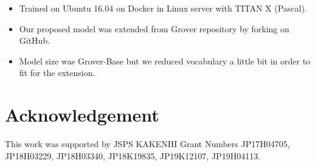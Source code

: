 \documentclass[conference]{IEEEtran}
\begin{document}
\label{app:settings}
\begin{itemize}[]
    \item Trained on Ubuntu 16.04 on Docker in Linux server with TITAN X (Pascal).
    \item Our proposed model was extended from Grover repository by forking on GitHub.
    \item Model size was Grover-Base but we reduced vocabulary a little bit in order to fit for the extension.
\end{itemize}

\section*{Acknowledgement}
This work was supported by JSPS KAKENHI Grant Numbers JP17H04705, JP18H03229, JP18H03340, JP18K19835, JP19K12107, JP19H04113.



\end{document}
